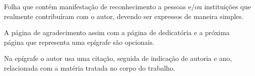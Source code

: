 
\begin{agradecimentos}%
Folha que contém manifestação de reconhecimento a pessoas e/ou instituições que realmente contribuíram com o autor, devendo ser expressos de maneira simples.

A página de agradecimento assim com a página de dedicatória e a próxima página que representa uma epígrafe são opcionais.

Na epígrafe o autor usa uma citação, seguida de indicação de autoria e ano, relacionada com a matéria tratada no corpo do trabalho.
\end{agradecimentos}

